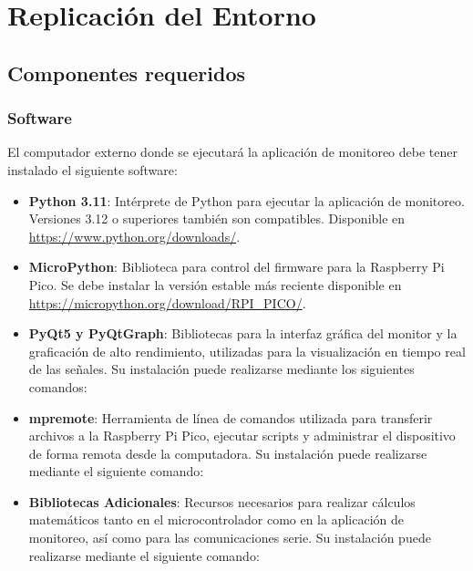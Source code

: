 \documentclass[12pt,letterpaper]{report}
\begin{document}
\chapter{Replicación del Entorno}

\section{Componentes requeridos}


\subsection{Software}
\label{subsec:software}

El computador externo donde se ejecutará la aplicación de monitoreo debe tener instalado el siguiente software:

\begin{itemize}
  \item \textbf{Python 3.11}: Intérprete de Python para ejecutar la aplicación de monitoreo.
        Versiones 3.12 o superiores también son compatibles. Disponible en \url{https://www.python.org/downloads/}.

  \item \textbf{MicroPython}: Biblioteca para control del firmware para la Raspberry Pi Pico. Se debe instalar la
        versión estable más reciente disponible en
        \url{https://micropython.org/download/RPI_PICO/}.

   \item \textbf{PyQt5 y PyQtGraph}: Bibliotecas para la interfaz gráfica del monitor y la graficación de alto rendimiento, utilizadas para la visualización en tiempo real de las señales. Su instalación puede realizarse mediante los siguientes comandos:
      \begin{center}
      \end{center}
      
   \item \textbf{mpremote}: Herramienta de línea de comandos utilizada para transferir archivos a la Raspberry Pi Pico, ejecutar scripts y administrar el dispositivo de forma remota desde la computadora. Su instalación puede realizarse mediante el siguiente comando:
       
      \begin{center}
      \end{center}   

    \item \textbf{Bibliotecas Adicionales}: Recursos necesarios para realizar cálculos matemáticos tanto en el microcontrolador como en la aplicación de monitoreo, así como para las comunicaciones serie. Su instalación puede realizarse mediante el siguiente comando:
      
      \begin{center}
      \end{center}
     

\end{itemize}
\end{document}
